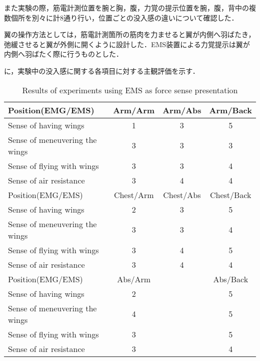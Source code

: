     また実験の際，筋電計測位置を腕と胸，腹，力覚の提示位置を腕，腹，背中の複数個所を別々に計8通り行い，位置ごとの没入感の違いについて確認した．

    翼の操作方法としては，筋電計測箇所の筋肉を力ませると翼が内側へ羽ばたき，弛緩させると翼が外側に開くように設計した．EMS装置による力覚提示は翼が内側へ羽ばたく際に行うものとした．


    に，実験中の没入感に関する各項目に対する主観評価を示す．
    
    \begin{table}[t]
        \begin{center}
            \caption{Results of experiments using EMS as force sense presentation}
            \scalebox{0.75}
            {
                \begin{tabular}{l|c|c|c}
                    \hline
                    Position(EMG/EMS) & Arm/Arm & Arm/Abs & Arm/Back \\\hline
                    Sense of having wings & 1 & 3 & 5 \\
                    Sense of meneuvering the wings & 3 & 3 & 3\\
                    Sense of flying with wings & 3 & 3 & 4 \\
                    Sense of air resistance & 3 & 4 & 4 \\\hline\hline

                    Position(EMG/EMS) & Chest/Arm & Chest/Abs & Chest/Back \\\hline
                    Sense of having wings & 2 & 3 & 5 \\
                    Sense of meneuvering the wings & 3& 3 & 4\\
                    Sense of flying with wings & 3 & 4 & 5 \\                        
                    Sense of air resistance & 3 & 4 & 4 \\\hline\hline

                    Position(EMG/EMS) & Abs/Arm & & Abs/Back  \\\hline                        
                    Sense of having wings & 2 && 5 \\                        
                    Sense of meneuvering the wings & 4 && 5 \\
                    Sense of flying with wings & 3 && 5 \\
                    Sense of air resistance & 3 && 4\\\hline\hline
                \end{tabular}
            }
        \end{center}
    \end{table}
    

